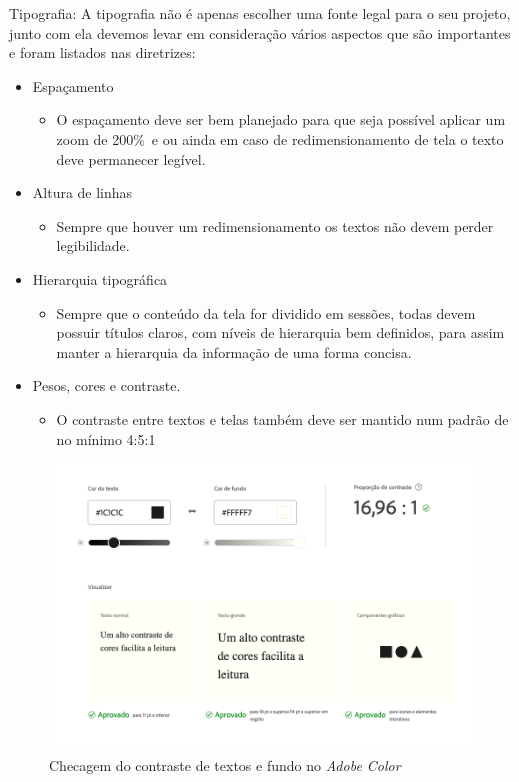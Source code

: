 {\newpage
Tipografia: A tipografia não é apenas escolher uma fonte legal para o seu projeto, junto com ela devemos levar em consideração vários aspectos que são importantes e foram listados nas diretrizes: 
\begin{itemize}
\item Espaçamento
\begin{itemize}
\item O espaçamento deve ser bem planejado para que seja possível aplicar um zoom de 200\%\ e ou ainda em caso de redimensionamento de tela o texto deve permanecer legível. 
\end{itemize}
\item Altura de linhas
\begin{itemize}
\item Sempre que houver um redimensionamento os textos não devem perder legibilidade.
\end{itemize}
\item Hierarquia tipográfica
\begin{itemize}
\item Sempre que o conteúdo da tela for dividido em sessões, todas devem possuir títulos claros, com níveis de hierarquia bem definidos, para assim manter a hierarquia da informação de uma forma concisa. 
\end{itemize}
\item Pesos, cores e contraste. 
\begin{itemize}
\item O contraste entre textos e telas também deve ser mantido num padrão de no mínimo 4:5:1
\end{itemize}
\end{itemize}

\begin{figure}[ht]
        \centering
    	\includegraphics[width=1.0\textwidth]{images/contrast_check.png}
        \caption{Checagem do contraste de textos e fundo no \textit{Adobe Color}}
\end{figure} 

}
